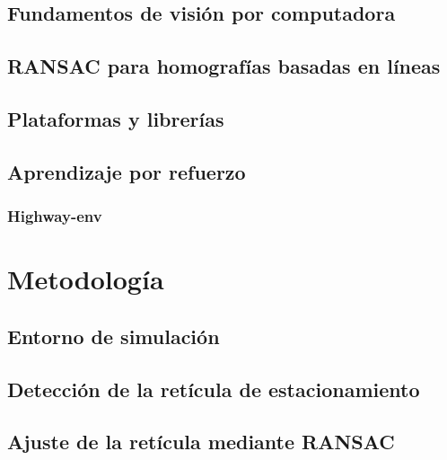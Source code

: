 \documentclass[10pt,letterpaper,final]{report}
\newlength{\spacing}
\newcommand{\nspace}[1]{\setlength{\baselineskip}{#1\spacing}}
\newenvironment{linespacing}[1]{\nspace{#1}}{}
\begin{document}
\begin{linespacing}{1.5}
\section{Fundamentos de visión por computadora}\label{sec:vision}


\section{RANSAC para homografías basadas en líneas}\label{sec:ransac-teorico}


\section{Plataformas y librerías}\label{sec:plataformas}


\section{Aprendizaje por refuerzo}


\subsection{Highway-env}\label{subsec:rl-highway-theory}


\clearpage
\chapter{Metodología}\label{chap:metodologia}


\section{Entorno de simulación}\label{sec:carla}


\section{Detección de la retícula de estacionamiento}\label{sec:metodo-reticula}


\section{Ajuste de la retícula mediante RANSAC}\label{sec:metodo-ransac}



\end{linespacing}
\end{document}
